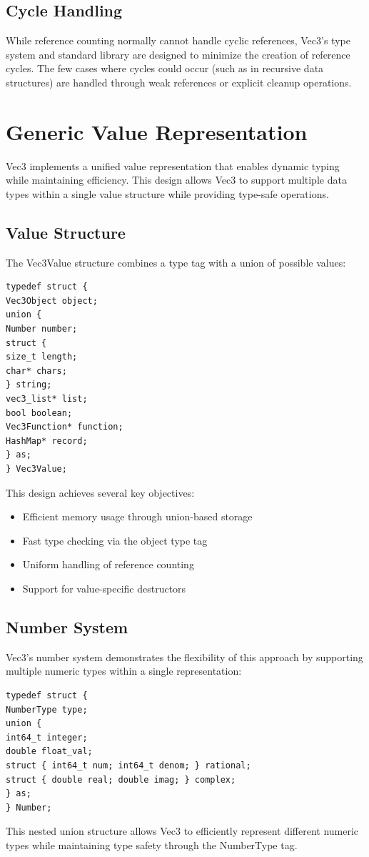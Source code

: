 \subsection{Cycle Handling}
While reference counting normally cannot handle cyclic references, Vec3's type system and standard library are designed to minimize the creation of reference cycles. The few cases where cycles could occur (such as in recursive data structures) are handled through weak references or explicit cleanup operations.
\section{Generic Value Representation}
\label{sec:generic-value}
Vec3 implements a unified value representation that enables dynamic typing while maintaining efficiency. This design allows Vec3 to support multiple data types within a single value structure while providing type-safe operations.
\subsection{Value Structure}
The Vec3Value structure combines a type tag with a union of possible values:
\begin{verbatim}
typedef struct {
Vec3Object object;
union {
Number number;
struct {
size_t length;
char* chars;
} string;
vec3_list* list;
bool boolean;
Vec3Function* function;
HashMap* record;
} as;
} Vec3Value;
\end{verbatim}
This design achieves several key objectives:
\begin{itemize}
\item Efficient memory usage through union-based storage
\item Fast type checking via the object type tag
\item Uniform handling of reference counting
\item Support for value-specific destructors
\end{itemize}
\subsection{Number System}
Vec3's number system demonstrates the flexibility of this approach by supporting multiple numeric types within a single representation:
\begin{verbatim}
typedef struct {
NumberType type;
union {
int64_t integer;
double float_val;
struct { int64_t num; int64_t denom; } rational;
struct { double real; double imag; } complex;
} as;
} Number;
\end{verbatim}
This nested union structure allows Vec3 to efficiently represent different numeric types while maintaining type safety through the NumberType tag.
